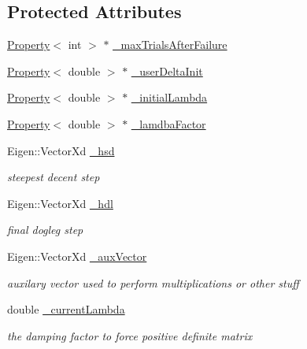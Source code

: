 \subsection*{Protected Attributes}
\begin{DoxyCompactItemize}
\item 
\mbox{\hyperlink{classg2o_1_1_property}{Property}}$<$ int $>$ $\ast$ \mbox{\hyperlink{classg2o_1_1_optimization_algorithm_dogleg_a5993c68e69cd037b1420b4addf9f7e50}{\+\_\+max\+Trials\+After\+Failure}}
\item 
\mbox{\hyperlink{classg2o_1_1_property}{Property}}$<$ double $>$ $\ast$ \mbox{\hyperlink{classg2o_1_1_optimization_algorithm_dogleg_ae77ffaea89872affeb61f122f20efeb9}{\+\_\+user\+Delta\+Init}}
\item 
\mbox{\hyperlink{classg2o_1_1_property}{Property}}$<$ double $>$ $\ast$ \mbox{\hyperlink{classg2o_1_1_optimization_algorithm_dogleg_a3a94c7696f07e3def38ec96a1979babd}{\+\_\+initial\+Lambda}}
\item 
\mbox{\hyperlink{classg2o_1_1_property}{Property}}$<$ double $>$ $\ast$ \mbox{\hyperlink{classg2o_1_1_optimization_algorithm_dogleg_a6855a511dc998efef7eaa0ef99e1b814}{\+\_\+lamdba\+Factor}}
\item 
Eigen\+::\+Vector\+Xd \mbox{\hyperlink{classg2o_1_1_optimization_algorithm_dogleg_a8f4ee408fbf3999063d094cf61e852b7}{\+\_\+hsd}}
\begin{DoxyCompactList}\small\item\em steepest decent step \end{DoxyCompactList}\item 
Eigen\+::\+Vector\+Xd \mbox{\hyperlink{classg2o_1_1_optimization_algorithm_dogleg_aaf433c824153a7bd76b27690eb53113b}{\+\_\+hdl}}
\begin{DoxyCompactList}\small\item\em final dogleg step \end{DoxyCompactList}\item 
Eigen\+::\+Vector\+Xd \mbox{\hyperlink{classg2o_1_1_optimization_algorithm_dogleg_a225092fe67ce75eb64011c1f45d8d936}{\+\_\+aux\+Vector}}
\begin{DoxyCompactList}\small\item\em auxilary vector used to perform multiplications or other stuff \end{DoxyCompactList}\item 
double \mbox{\hyperlink{classg2o_1_1_optimization_algorithm_dogleg_aacc051a6740fc6017dac7c424dc7df3d}{\+\_\+current\+Lambda}}
\begin{DoxyCompactList}\small\item\em the damping factor to force positive definite matrix \end{DoxyCompactList}\item 

\end{DoxyCompactItemize}
